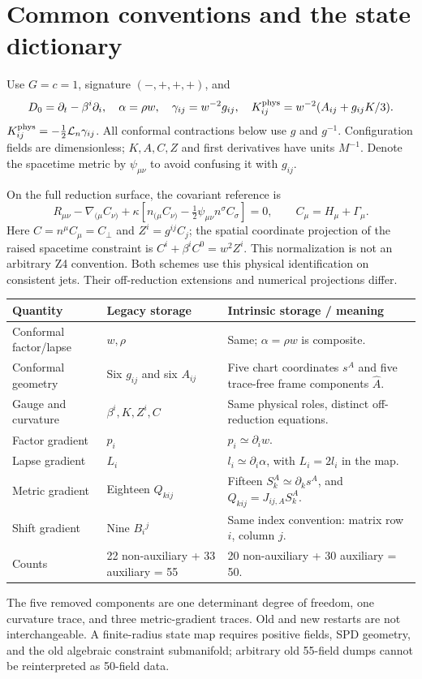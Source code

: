 \documentclass[11pt,letterpaper]{article}
\newcommand{\D}{D_0}\newcommand{\TF}{\operatorname{TF}}\newcommand{\tr}{\operatorname{tr}}
\begin{document}
\section{Common conventions and the state dictionary}
Use $G=c=1$, signature $(-,+,+,+)$, and
\begin{equation}
\D=\partial_t-\beta^i\partial_i,\quad \alpha=\rho w,\quad
\gamma_{ij}=w^{-2}g_{ij},\quad
K^{\rm phys}_{ij}=w^{-2}(A_{ij}+g_{ij}K/3).
\end{equation}
$K^{\rm phys}_{ij}=-\tfrac12\mathcal L_n\gamma_{ij}$. All conformal contractions below use $g$ and $g^{-1}$. Configuration fields are dimensionless; $K,A,C,Z$ and first derivatives have units $M^{-1}$. Denote the spacetime metric by $\psi_{\mu\nu}$ to avoid confusing it with $g_{ij}$.

On the full reduction surface, the covariant reference is
\begin{equation}
R_{\mu\nu}-\nabla_{(\mu}C_{\nu)}+
\kappa\left[n_{(\mu}C_{\nu)}-\tfrac12\psi_{\mu\nu}n^\sigma C_\sigma\right]=0,
\qquad C_\mu=H_\mu+\Gamma_\mu.
\end{equation}
Here $C=n^\mu C_\mu=C_\perp$ and $Z^i=g^{ij}C_j$; the spatial coordinate projection of the raised spacetime constraint is $C^i+\beta^iC^0=w^2 Z^i$. This normalization is not an arbitrary Z4 convention. Both schemes use this physical identification on consistent jets. Their off-reduction extensions and numerical projections differ.

\begin{longtable}{P{.22\linewidth}P{.32\linewidth}P{.38\linewidth}}
\toprule Quantity & Legacy storage & Intrinsic storage / meaning\\\midrule
Conformal factor/lapse & $w,\rho$ & Same; $\alpha=\rho w$ is composite.\\
Conformal geometry & Six $g_{ij}$ and six $A_{ij}$ & Five chart coordinates $s^A$ and five trace-free frame components $\widehat A$.\\
Gauge and curvature & $\beta^i,K,Z^i,C$ & Same physical roles, distinct off-reduction equations.\\
Factor gradient & $p_i$ & $p_i\simeq\partial_iw$.\\
Lapse gradient & $L_i$ & $l_i\simeq\partial_i\alpha$, with $L_i=2l_i$ in the map.\\
Metric gradient & Eighteen $Q_{kij}$ & Fifteen $S_k^A\simeq\partial_ks^A$, and $Q_{kij}=J_{ij,A}S_k^A$.\\
Shift gradient & Nine $B_i{}^j$ & Same index convention: matrix row $i$, column $j$.\\
Counts & 22 non-auxiliary + 33 auxiliary = 55 & 20 non-auxiliary + 30 auxiliary = 50.\\\bottomrule
\end{longtable}
The five removed components are one determinant degree of freedom, one curvature trace, and three metric-gradient traces. Old and new restarts are not interchangeable. A finite-radius state map requires positive fields, SPD geometry, and the old algebraic constraint submanifold; arbitrary old 55-field dumps cannot be reinterpreted as 50-field data.
\end{document}
